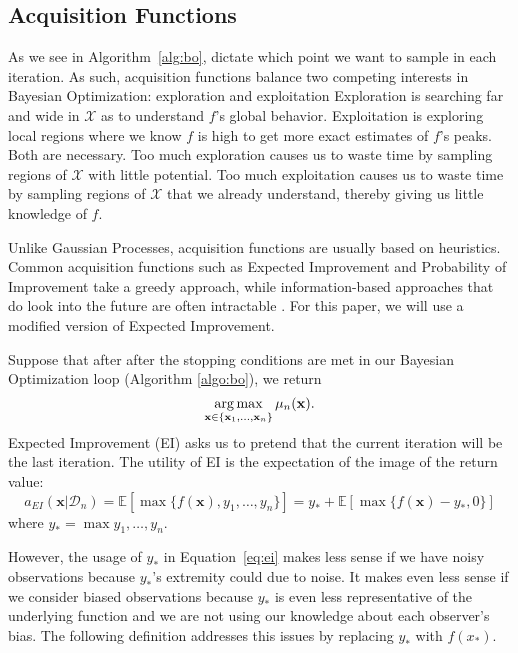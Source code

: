 \subsection{Acquisition Functions}
As we see in Algorithm~\ref{alg:bo}, dictate which point we want to sample in each iteration.
As such, acquisition functions balance two competing interests in Bayesian Optimization: exploration and exploitation Exploration is searching far and wide in $\mathcal{X}$ as to understand $f$'s global behavior.
Exploitation is exploring local regions where we know $f$ is high to get more exact estimates of $f$'s peaks.
Both are necessary.
Too much exploration causes us to waste time by sampling regions of $\mathcal{X}$ with little potential.
Too much exploitation causes us to waste time by sampling regions of $\mathcal{X}$ that we already understand, thereby giving us little knowledge of $f$.

Unlike Gaussian Processes, acquisition functions are usually based on heuristics.
Common acquisition functions such as Expected Improvement and Probability of Improvement take a greedy approach, while information-based approaches that do look into the future are often intractable \cite{shahriari2016}.
For this paper, we will use a modified version of Expected Improvement.

Suppose that after after the stopping conditions are met in our Bayesian Optimization loop (Algorithm \ref{algo:bo}),
we return
\begin{equation*}
    \operatorname*{arg\,max}_{\mathbf{x} \in \{ \mathbf{x}_1, \ldots, \mathbf{x}_n \}} \mu_n(\mathbf{x}).
\end{equation*}
Expected Improvement (EI) asks us to pretend that the current iteration will be the last iteration.
The utility of EI is the expectation of the image of the return value:
\begin{equation}
    \label{eq:ei}
    a_{EI}(\mathbf{x} | \mathcal{D}_n) = \mathbb{E}[\max\{f(\mathbf{x}), y_1, \ldots, y_n\}]
    = y_* + \mathbb{E}[\max\{f(\mathbf{x}) - y_*, 0\}]
\end{equation}
where $y_* = \max{y_1, \ldots, y_n}$.

However, the usage of $y_*$ in Equation~\ref{eq:ei} makes less sense if we have noisy observations because $y_*$'s extremity could due to noise.
It makes even less sense if we consider biased observations because $y_*$ is even less representative of the underlying function and we are not using our knowledge about each observer's bias.
The following definition addresses this issues by replacing $y_*$ with $f(x_*)$.

